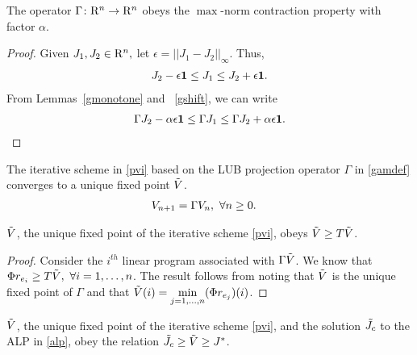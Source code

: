 \begin{theorem}\label{gmaxcontra}
The operator $\Gamma  \colon \mathrm{R}^n\rightarrow \mathrm{R}^n$ obeys the $\max$-norm contraction property with factor $\alpha$.
\end{theorem}
\begin{proof}
Given $J_1,J_2\in \mathrm{R}^n,$ let $\epsilon=||J_1-J_2||_\infty$. Thus,
\begin{align}\label{ineq}
J_2-\epsilon\mathbf{1}\leq J_1\leq J_2+\epsilon \mathbf{1}.
\end{align}
From Lemmas~\ref{gmonotone} and ~\ref{gshift}, we can write
\begin{align}\label{ineq}
\Gamma J_2-\alpha \epsilon\mathbf{1}\leq \Gamma J_1\leq \Gamma J_2+\alpha \epsilon\mathbf{1}.
\end{align}
\end{proof}
\begin{corollary}
The iterative scheme in \eqref{pvi} based on the LUB projection operator $\Gamma$ in \eqref{gamdef} converges to a unique fixed point $\tilde{V}$.
\begin{align}\label{pvi}
V_{n+1}&=\Gamma V_n,\mbox{ } \forall n\geq 0.
\end{align}
\end{corollary}
\begin{lemma}\label{gfp}
 $\tilde{V}$, the unique fixed point of the iterative scheme \eqref{pvi}, obeys $\tilde{V}\geq T\tilde{V}$.
\end{lemma}
\begin{proof}
Consider the $i^{th}$ linear program associated with $\Gamma \tilde{V}$. We know that $\Phi r_{e_i}\geq T \tilde{V},\mbox{ } \forall i=1,\ldots, n$. The result follows from noting that $\tilde{V}$ is the unique fixed point of $\Gamma $ and that $\tilde{V}(i)=\underset{j=1,\ldots,n}{\min}(\Phi r_{e_j})(i)$.
\end{proof}
\begin{lemma}\label{relation1}
 $\tilde{V}$, the unique fixed point of the iterative scheme \eqref{pvi}, and the solution $\tilde{J}_c$ to the ALP in \eqref{alp}, obey the relation $\tilde{J}_c\geq\tilde{V}\geq J^*$.
\end{lemma}
